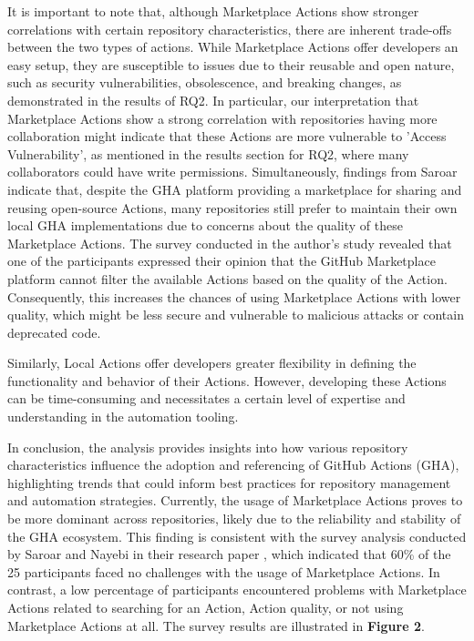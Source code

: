 \documentclass[conference]{IEEEtran}
\begin{document}
	It is important to note that, although Marketplace Actions show stronger correlations with certain repository characteristics, there are inherent trade-offs between the two types of actions. While Marketplace Actions offer developers an easy setup, they are susceptible to issues due to their reusable and open nature, such as security vulnerabilities, obsolescence, and breaking changes, as demonstrated in the results of RQ2. In particular, our interpretation that Marketplace Actions show a strong correlation with repositories having more collaboration might indicate that these Actions are more vulnerable to 'Access Vulnerability', as mentioned in the results section for RQ2, where many collaborators could have write permissions. Simultaneously, findings from Saroar \cite{saroar2023developers} indicate that, despite the GHA platform providing a marketplace for sharing and reusing open-source Actions, many repositories still prefer to maintain their own local GHA implementations due to concerns about the quality of these Marketplace Actions. The survey conducted in the author's study revealed that one of the participants expressed their opinion that the GitHub Marketplace platform cannot filter the available Actions based on the quality of the Action. Consequently, this increases the chances of using Marketplace Actions with lower quality, which might be less secure and vulnerable to malicious attacks or contain deprecated code.

	Similarly, Local Actions offer developers greater flexibility in defining the functionality and behavior of their Actions. However, developing these Actions can be time-consuming and necessitates a certain level of expertise and understanding in the automation tooling.

	In conclusion, the analysis provides insights into how various repository characteristics influence the adoption and referencing of GitHub Actions (GHA), highlighting trends that could inform best practices for repository management and automation strategies. Currently, the usage of Marketplace Actions proves to be more dominant across repositories, likely due to the reliability and stability of the GHA ecosystem. This finding is consistent with the survey analysis conducted by Saroar and Nayebi in their research paper \cite{saroar2023developers}, which indicated that 60\% of the 25 participants faced no challenges with the usage of Marketplace Actions. In contrast, a low percentage of participants encountered problems with Marketplace Actions related to searching for an Action, Action quality, or not using Marketplace Actions at all. The survey results are illustrated in \textbf{Figure 2}. \\
\end{document}
